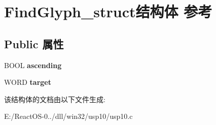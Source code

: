 \hypertarget{struct_find_glyph__struct}{}\section{Find\+Glyph\+\_\+struct结构体 参考}
\label{struct_find_glyph__struct}
\subsection*{Public 属性}
\begin{DoxyCompactItemize}
\item 
\mbox{\label{struct_find_glyph__struct_a8549343263c1f0f517edfd94bcabc570}} 
B\+O\+OL {\bfseries ascending}
\item 
\mbox{\label{struct_find_glyph__struct_a734d86696438fc5813df639152a75623}} 
W\+O\+RD {\bfseries target}
\end{DoxyCompactItemize}


该结构体的文档由以下文件生成\+:\begin{DoxyCompactItemize}
\item 
E\+:/\+React\+O\+S-\/0../dll/win32/usp10/usp10.\+c\end{DoxyCompactItemize}
